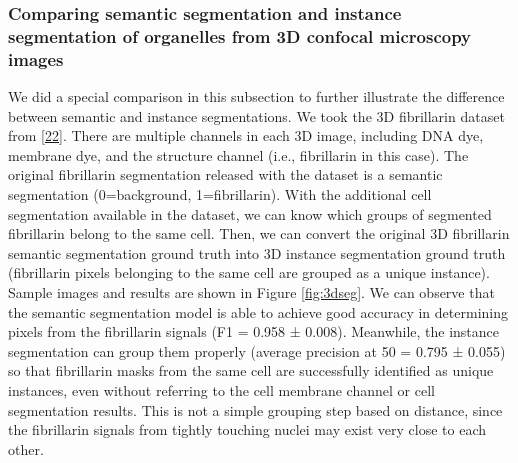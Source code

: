 \hypertarget{comparing-semantic-segmentation-and-instance-segmentation-of-organelles-from-3d-confocal-microscopy-images}{%
\subsubsection{Comparing semantic segmentation and instance segmentation of organelles from 3D confocal microscopy images}\label{comparing-semantic-segmentation-and-instance-segmentation-of-organelles-from-3d-confocal-microscopy-images}}

We did a special comparison in this subsection to further illustrate the difference between semantic and instance segmentations. We took the 3D fibrillarin dataset from {[}\protect\hyperlink{ref-5sGcmDuy}{22}{]}. There are multiple channels in each 3D image, including DNA dye, membrane dye, and the structure channel (i.e., fibrillarin in this case). The original fibrillarin segmentation released with the dataset is a semantic segmentation (0=background, 1=fibrillarin). With the additional cell segmentation available in the dataset, we can know which groups of segmented fibrillarin belong to the same cell. Then, we can convert the original 3D fibrillarin semantic segmentation ground truth into 3D instance segmentation ground truth (fibrillarin pixels belonging to the same cell are grouped as a unique instance). Sample images and results are shown in Figure \ref{fig:3dseg}. We can observe that the semantic segmentation model is able to achieve good accuracy in determining pixels from the fibrillarin signals (F1 = 0.958 ± 0.008). Meanwhile, the instance segmentation can group them properly (average precision at 50 = 0.795 ± 0.055) so that fibrillarin masks from the same cell are successfully identified as unique instances, even without referring to the cell membrane channel or cell segmentation results. This is not a simple grouping step based on distance, since the fibrillarin signals from tightly touching nuclei may exist very close to each other.

